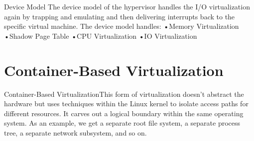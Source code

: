 Device  Model
The device model of the hypervisor handles the I/O virtualization again by trapping 
and emulating and then delivering interrupts back to the specific virtual machine.
The device model handles:
•Memory  Virtualization
•Shadow Page Table
•CPU  Virtualization
•IO  Virtualization

\section{Container-Based  Virtualization}
Container-Based  VirtualizationThis form of virtualization doesn’t abstract the 
hardware but uses techniques within the Linux kernel to isolate access paths for
 different resources. It carves out a logical boundary within the same operating 
 system. As an example, we get a separate root file system, a separate process tree, 
 a separate network subsystem, and so on.


